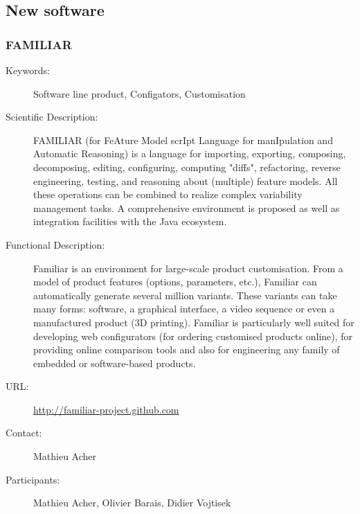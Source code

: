 \subsection{New software}
\label{softwares}
\subsubsection{FAMILIAR}
\label{bil-1468}
\begin{description}
\item[Keywords:] Software line product, Configators, Customisation
\item[Scientific Description:]
FAMILIAR (for FeAture Model scrIpt Language for manIpulation and Automatic Reasoning) is a language for importing, exporting, composing, decomposing, editing, configuring, computing "diffs", refactoring, reverse engineering, testing, and reasoning about (multiple) feature models. All these operations can be combined to realize complex variability management tasks. 
A comprehensive environment is proposed as well as integration facilities with the Java ecosystem.
\item[Functional Description:]
Familiar is an environment for large-scale product customisation. From a model of product features (options, parameters, etc.), Familiar can automatically generate several million variants. These variants can take many forms: software, a graphical interface, a video sequence or even a manufactured product (3D printing). Familiar is particularly well suited for developing web configurators (for ordering customised products online), for providing online comparison tools and also for engineering any family of embedded or software-based products.




\item[URL:] \url{http://familiar-project.github.com}
\item[Contact:] Mathieu Acher
\item[Participants:] Mathieu Acher, Olivier Barais, Didier Vojtisek
\end{description}

